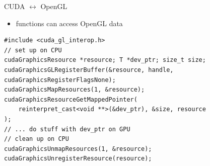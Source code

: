 \begin{frame}[fragile]{CUDA $\leftrightarrow$ OpenGL}
    \center
    \begin{itemize}
        \item<1->  functions can access OpenGL data
    \end{itemize}
    \begin{verbatim}
#include <cuda_gl_interop.h>
// set up on CPU
cudaGraphicsResource *resource; T *dev_ptr; size_t size;
cudaGraphicsGLRegisterBuffer(&resource, handle, cudaGraphicsRegisterFlagsNone);
cudaGraphicsMapResources(1, &resource);
cudaGraphicsResourceGetMappedPointer(
    reinterpret_cast<void **>(&dev_ptr), &size, resource
);
// ... do stuff with dev_ptr on GPU
// clean up on CPU
cudaGraphicsUnmapResources(1, &resource);
cudaGraphicsUnregisterResource(resource);
    \end{verbatim}
\end{frame}